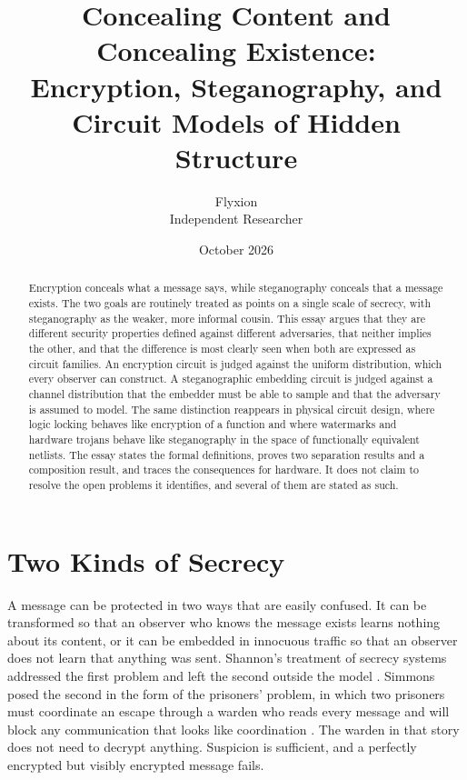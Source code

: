 \documentclass[11pt]{article}
\title{Concealing Content and Concealing Existence:\\
Encryption, Steganography, and Circuit Models of Hidden Structure}
\author{Flyxion\\Independent Researcher}
\date{October 2026}
\theoremstyle{definition}
\theoremstyle{remark}
\begin{document}
\maketitle

\begin{abstract}
\noindent Encryption conceals what a message says, while steganography conceals that a message exists. The two goals are routinely treated as points on a single scale of secrecy, with steganography as the weaker, more informal cousin. This essay argues that they are different security properties defined against different adversaries, that neither implies the other, and that the difference is most clearly seen when both are expressed as circuit families. An encryption circuit is judged against the uniform distribution, which every observer can construct. A steganographic embedding circuit is judged against a channel distribution that the embedder must be able to sample and that the adversary is assumed to model. The same distinction reappears in physical circuit design, where logic locking behaves like encryption of a function and where watermarks and hardware trojans behave like steganography in the space of functionally equivalent netlists. The essay states the formal definitions, proves two separation results and a composition result, and traces the consequences for hardware. It does not claim to resolve the open problems it identifies, and several of them are stated as such.
\end{abstract}

\section{Two Kinds of Secrecy}

A message can be protected in two ways that are easily confused. It can be transformed so that an observer who knows the message exists learns nothing about its content, or it can be embedded in innocuous traffic so that an observer does not learn that anything was sent. Shannon's treatment of secrecy systems addressed the first problem and left the second outside the model \cite{shannon1949}. Simmons posed the second in the form of the prisoners' problem, in which two prisoners must coordinate an escape through a warden who reads every message and will block any communication that looks like coordination \cite{simmons1984}. The warden in that story does not need to decrypt anything. Suspicion is sufficient, and a perfectly encrypted but visibly encrypted message fails.
\end{document}
